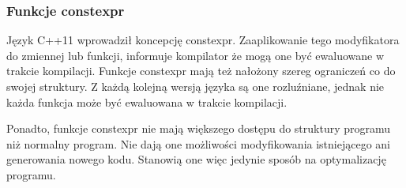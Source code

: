 \subsubsection{Funkcje constexpr}
Język C++11 wprowadził koncepcję constexpr. Zaaplikowanie tego modyfikatora do zmiennej lub funkcji, informuje kompilator że mogą one być ewaluowane w trakcie kompilacji. Funkcje constexpr mają też nałożony szereg ograniczeń co do swojej struktury. Z każdą kolejną wersją języka są one rozluźniane, jednak nie każda funkcja może być ewaluowana w trakcie kompilacji.\par
Ponadto, funkcje constexpr nie mają większego dostępu do struktury programu niż normalny program. Nie dają one możliwości modyfikowania istniejącego ani generowania nowego kodu. Stanowią one więc jedynie sposób na optymalizację programu.\par
